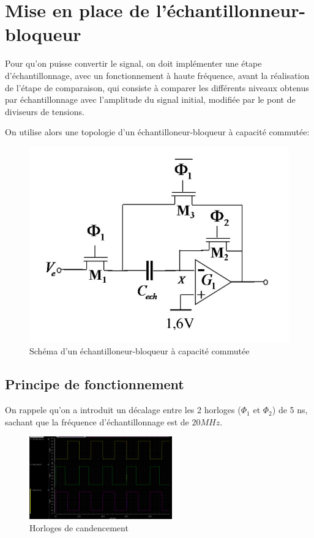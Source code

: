\documentclass[11pt]{article}
\begin{document}
\clearpage

\section{Mise en place de l'\'echantillonneur-bloqueur}
Pour qu'on puisse convertir le signal, on doit impl\'ementer une \'etape d'\'echantillonnage, avec un fonctionnement \`a haute fr\'equence,
avant la r\'ealisation de l'\'etape de comparaison, qui consiste \`a comparer les diff\'erents niveaux obtenus par \'echantillonnage avec l'amplitude du signal initial,
modifi\'ee par le pont de diviseurs de tensions.

On utilise alors une topologie d'un \'echantilloneur-bloqueur \`a capacit\'e commut\'ee:

\begin{figure}[!htb]
\begin{center}
  \includegraphics[scale=0.30]{Echantillonneur-bloqueur.jpg}
  \caption{Sch\'ema d'un \'echantilloneur-bloqueur \`a capacit\'e commut\'ee}
\end{center}
\end{figure}

\subsection{Principe de fonctionnement}

On rappele qu'on a introduit un d\'ecalage entre les 2 horloges ($\Phi_1$ et $\Phi_2$) de 5 ns, sachant que la
fr\'equence d'\'echantillonnage est de $20 MHz$.

\begin{figure}
\begin{center}
  \includegraphics[width=0.55\textwidth]{clocks_.png}
\end{center}
\caption{Horloges de candencement}
\end{figure}
\end{document}
